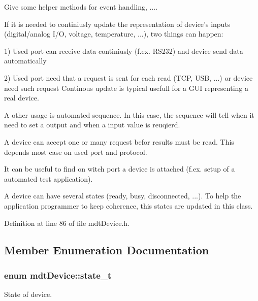 Give some helper methods for event handling, ....

If it is needed to continiusly update the representation of device's inputs (digital/analog I/O, voltage, temperature, ...), two things can happen:
\begin{DoxyItemize}
\item 1) Used port can receive data continiusly (f.ex. RS232) and device send data automatically
\item 2) Used port need that a request is sent for each read (TCP, USB, ...) or device need such request Continous update is typical usefull for a GUI representing a real device.
\end{DoxyItemize}

A other usage is automated sequence. In this case, the sequence will tell when it need to set a output and when a input value is reuqierd.

A device can accept one or many request befor results must be read. This depends most case on used port and protocol.

It can be useful to find on witch port a device is attached (f.ex. setup of a automated test application).

A device can have several states (ready, busy, disconnected, ...). To help the application programmer to keep coherence, this states are updated in this class. 

Definition at line 86 of file mdtDevice.h.



\subsection{Member Enumeration Documentation}
\hypertarget{classmdt_device_a39c301b1fda803dba0c9ab98164a9d1e}{
\subsubsection[{state\_\-t}]{\setlength{\rightskip}{0pt plus 5cm}enum {\bf mdtDevice::state\_\-t}}}
\label{classmdt_device_a39c301b1fda803dba0c9ab98164a9d1e}


State of device. 

